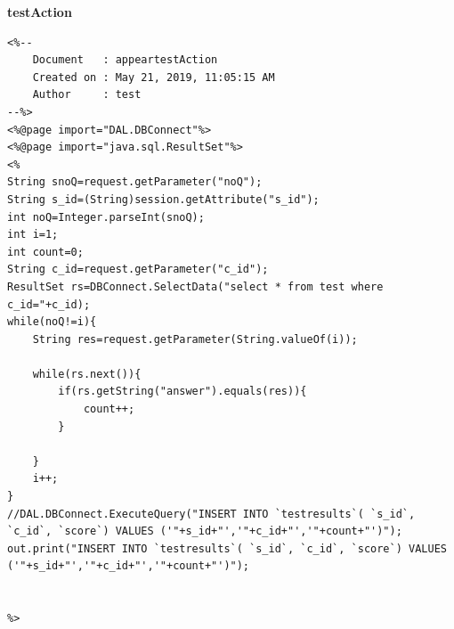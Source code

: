 {\bf testAction}
\begin{lstlisting}
<%-- 
    Document   : appeartestAction
    Created on : May 21, 2019, 11:05:15 AM
    Author     : test
--%>
<%@page import="DAL.DBConnect"%>
<%@page import="java.sql.ResultSet"%>
<%
String snoQ=request.getParameter("noQ");
String s_id=(String)session.getAttribute("s_id");
int noQ=Integer.parseInt(snoQ);
int i=1;
int count=0;
String c_id=request.getParameter("c_id");
ResultSet rs=DBConnect.SelectData("select * from test where c_id="+c_id);
while(noQ!=i){
    String res=request.getParameter(String.valueOf(i));
    
    while(rs.next()){
        if(rs.getString("answer").equals(res)){
            count++;
        }
            
    }
    i++;
}
//DAL.DBConnect.ExecuteQuery("INSERT INTO `testresults`( `s_id`, `c_id`, `score`) VALUES ('"+s_id+"','"+c_id+"','"+count+"')");
out.print("INSERT INTO `testresults`( `s_id`, `c_id`, `score`) VALUES ('"+s_id+"','"+c_id+"','"+count+"')");


%>
\end{lstlisting}

